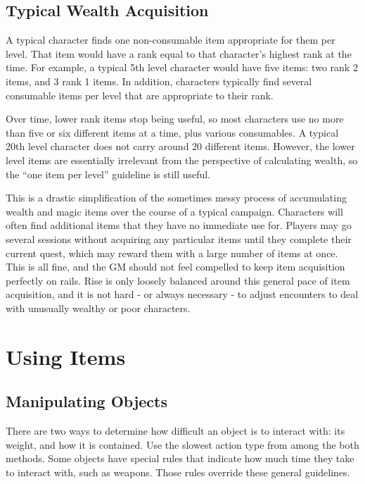   \subsection{Typical Wealth Acquisition}
    A typical character finds one non-consumable item appropriate for them per level.
    That item would have a rank equal to that character's highest rank at the time.
    For example, a typical 5th level character would have five items: two rank 2 items, and 3 rank 1 items.
    In addition, characters typically find several consumable items per level that are appropriate to their rank.

    Over time, lower rank items stop being useful, so most characters use no more than five or six different items at a time, plus various consumables.
    A typical 20th level character does not carry around 20 different items.
    However, the lower level items are essentially irrelevant from the perspective of calculating wealth, so the ``one item per level'' guideline is still useful.

    This is a drastic simplification of the sometimes messy process of accumulating wealth and magic items over the course of a typical campaign.
    Characters will often find additional items that they have no immediate use for.
    Players may go several sessions without acquiring any particular items until they complete their current quest, which may reward them with a large number of items at once.
    This is all fine, and the GM should not feel compelled to keep item acquisition perfectly on rails.
    Rise is only loosely balanced around this general pace of item acquisition, and it is not hard - or always necessary - to adjust encounters to deal with unusually wealthy or poor characters.

\section{Using Items}

  \subsection{Manipulating Objects}\label{Manipulating Objects}
    There are two ways to determine how difficult an object is to interact with: its weight, and how it is contained.
    Use the slowest action type from among the both methods.
    Some objects have special rules that indicate how much time they take to interact with, such as  weapons.
    Those rules override these general guidelines.

